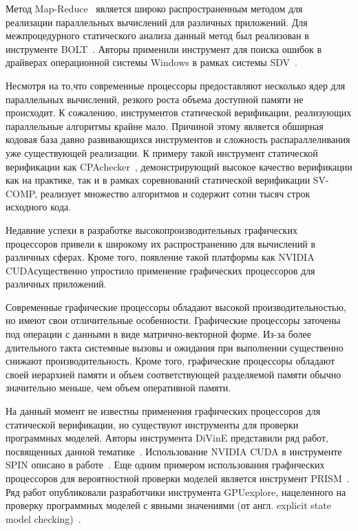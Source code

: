 \documentclass[%
candidate,     %
href,        %
colorlinks,  %
]{disser}
\begin{document}
Метод Map-Reduce~\cite{Dean:2008:MSD} является широко распространенным методом для реализации параллельных вычислений для различных приложений.
Для межпроцедурного статического анализа данный метод был реализован в инструменте BOLT~\cite{Albarghouthi:2012:PTI}.
Авторы применили инструмент для поиска ошибок в драйверах операционной системы Windows в рамках системы SDV~\cite{SLAM2}.

Несмотря на то,что современные процессоры предоставляют несколько ядер для параллельных вычислений, резкого роста объема доступной памяти не происходит.
К сожалению, инструментов статической верификации, реализующих параллельные алгоритмы крайне мало.
Причиной этому является обширная кодовая база давно развивающихся инструментов и сложность распараллеливания уже существующей реализации.
К примеру такой инструмент статической верификации как CPAchecker~\cite{Beyer:2011:CTC}, демонстрирующий высокое качество верификации как на практике, так и в рамках соревнований статической верификации SV-COMP, реализует множество алгоритмов и содержит сотни тысяч строк исходного кода.

Недавние успехи в разработке высокопроизводительных графических процессоров привели к широкому их распространению для вычислений в различных сферах.
Кроме того, появление такой платформы как NVIDIA CUDA\footnotemark существенно упростило применение графических процессоров для различных приложений.

Современные графические процессоры обладают высокой производительностью, но имеют свои отличительные особенности.
Графические процессоры заточены под операции с данными в виде матрично-векторной форме.
Из-за более длительного такта системные вызовы и ожидания при выполнении существенно снижают производительность.
Кроме того, графические процессоры обладают своей иерархией памяти и объем соответствующей разделяемой памяти обычно значительно меньше, чем объем оперативной памяти.

На данный момент не известны применения графических процессоров для статической верификации, но существуют инструменты для проверки программных моделей.
Авторы инструмента DiVinE представили ряд работ, посвященных данной тематике~\cite{Barnat2009CUDA,Barnat2010CUDA,Barnat2012CUDA}.
Использование NVIDIA CUDA в инструменте SPIN описано в работе~\cite{Bartocci:2014:TGS}.
Еще одним примером использования графических процессоров для вероятностной проверки моделей является инструмент PRISM~\cite{Kwiatkowska2002,Bosnacki:2010:GEP}.
Ряд работ опубликовали разработчики инструмента GPUexplore, нацеленного на проверку программных моделей с явными значениями (от англ. explicit state model checking)~\cite{Wijs2014,Wijs2016GPUexplore2U,Wijs2014,Neele2016}.
\end{document}
